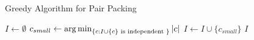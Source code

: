 \begin{frame}{Greedy Algorithm for Pair Packing}


\begin{algorithm}[H]
\begin{algorithmic}[1]

\STATE $I \gets \emptyset$
\STATE $c_{small} \gets \operatorname*{arg\,min}_{\{c : I \cup \{c\} \text{ is independent }\}}|c|$
\STATE $I \gets I \cup \{ c_{small} \}$
\ENDWHILE
\RETURN $I$


\end{algorithmic}
\caption{Greedy Algorithm}
\end{algorithm}


\end{frame}